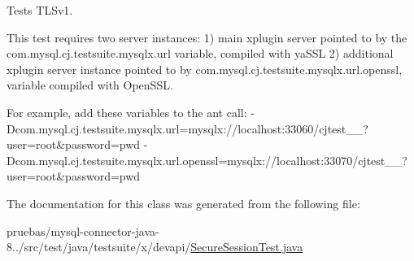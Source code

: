 Tests T\+L\+Sv1.

This test requires two server instances\+: 1) main xplugin server pointed to by the com.\+mysql.\+cj.\+testsuite.\+mysqlx.\+url variable, compiled with ya\+S\+SL 2) additional xplugin server instance pointed to by com.\+mysql.\+cj.\+testsuite.\+mysqlx.\+url.\+openssl, variable compiled with Open\+S\+SL.

For example, add these variables to the ant call\+: -\/\+Dcom.\+mysql.\+cj.\+testsuite.\+mysqlx.\+url=mysqlx\+://localhost\+:33060/cjtest\+\_\+\_?user=root\&password=pwd -\/\+Dcom.\+mysql.\+cj.\+testsuite.\+mysqlx.\+url.\+openssl=mysqlx\+://localhost\+:33070/cjtest\+\_\+\_?user=root\&password=pwd 

The documentation for this class was generated from the following file\+:\begin{DoxyCompactItemize}
\item 
pruebas/mysql-\/connector-\/java-\/8../src/test/java/testsuite/x/devapi/\mbox{\hyperlink{_secure_session_test_8java}{Secure\+Session\+Test.\+java}}\end{DoxyCompactItemize}
